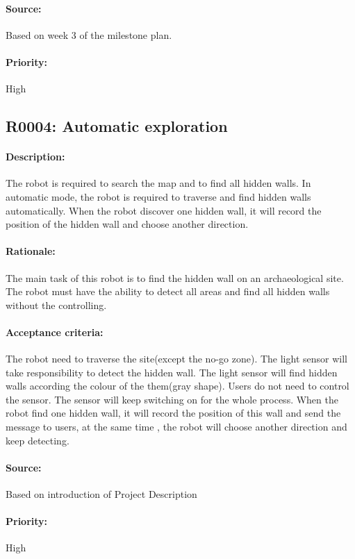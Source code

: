 \documentclass[11pt, a4paper]{report}
\begin{document}
\paragraph{Source:}
 Based on week 3 of the milestone plan. 
\paragraph{Priority:}
High



\subsection{R0004: Automatic exploration}
\paragraph{Description:}
The robot is required to search the map and to find all hidden walls. In automatic mode, the robot is required to traverse and find hidden walls automatically. When the robot discover one hidden wall, it will record the position of the hidden wall and choose another direction.
\paragraph{Rationale:}
The main task of this robot is to find the hidden wall on an archaeological site. The robot must have the ability to detect all areas and find all hidden walls without the controlling.   
\paragraph{Acceptance criteria:}
The robot need to traverse the site(except the no-go zone). The light sensor will take responsibility to detect the hidden wall. The light sensor will find hidden walls according the colour of the them(gray shape). Users do not need to control the sensor. The sensor will keep switching on for the whole process. When the robot find one hidden wall, it will record the position of this wall and send the message to users, at the same time , the robot will choose another direction and keep detecting.  
\paragraph{Source:}
 Based on introduction of Project Description
\paragraph{Priority:}
High
\end{document}
